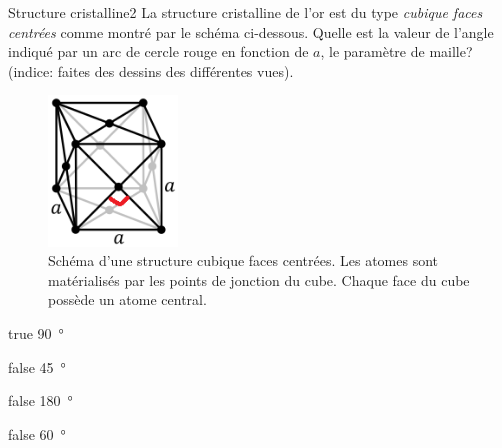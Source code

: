 \documentclass[11pt]{article}
\begin{document}
        \begin{question}{31}{Structure cristalline}{2}{}
            La structure cristalline de l'or est du type \emph{cubique faces centrées} comme montré par le schéma ci-dessous. Quelle est la valeur de l'angle indiqué par un arc de cercle rouge en fonction de $a$, le paramètre de maille? (indice: faites des dessins des différentes vues).
            \begin{figure}
                \centering
                \includegraphics[height = 4cm]{Antoine/Figures_Antoine/FCC2.png}
                \caption{Schéma d'une structure cubique faces centrées. Les atomes sont matérialisés par les points de jonction du cube. Chaque face du cube possède un atome central.}
            \end{figure}
        \end{question}
        \begin{reponses} 
            \item[true] \SI{90}{\degree}
            \item[false] \SI{45}{\degree} 
            \item[false] \SI{180}{\degree}
    	    \item[false] \SI{60}{\degree}
        \end{reponses}
        
\end{document}
